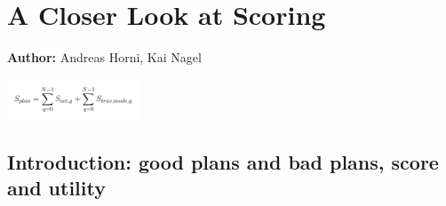 \chapter{A Closer Look at Scoring}
\label{ch:scoring}

\hfill \textbf{Author:} Andreas Horni, Kai Nagel

\begin{center} \includegraphics[width=0.3\textwidth, angle=0]{using/figures/utf.png} \end{center}


\section{Introduction: good plans and bad plans, score and utility}


